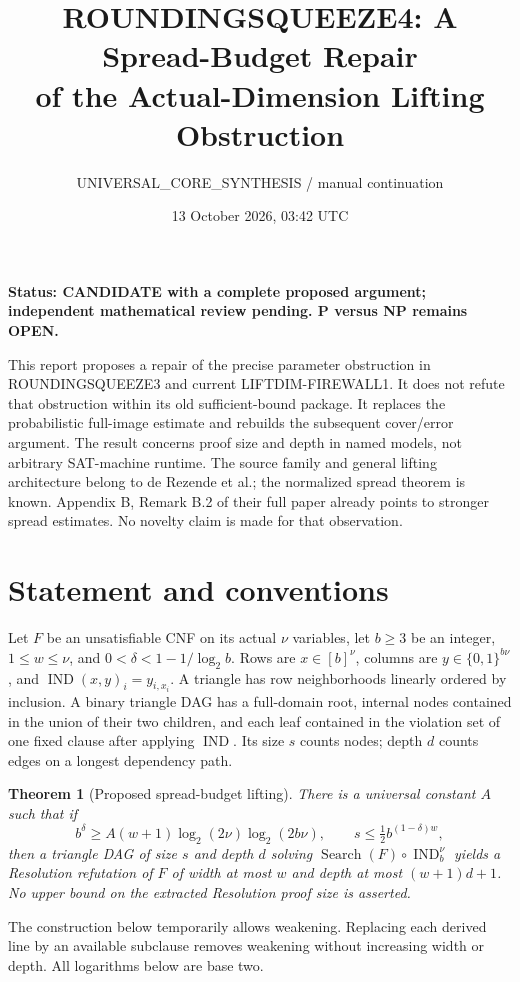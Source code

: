\documentclass[11pt]{article}
\title{ROUNDINGSQUEEZE4: A Spread-Budget Repair\\of the Actual-Dimension Lifting Obstruction}
\author{UNIVERSAL\_CORE\_SYNTHESIS / manual continuation}
\date{13 October 2026, 03:42 UTC}
\newtheorem{theorem}{Theorem}
\newcommand{\IND}{\operatorname{IND}}
\begin{document}
\maketitle
\noindent\textbf{Status: CANDIDATE with a complete proposed argument; independent mathematical review pending. P versus NP remains OPEN.}

This report proposes a repair of the precise parameter obstruction in
ROUNDINGSQUEEZE3 and current LIFTDIM-FIREWALL1. It does not refute that
obstruction within its old sufficient-bound package. It replaces the
probabilistic full-image estimate and rebuilds the subsequent cover/error
argument. The result concerns proof size and depth in named models, not
arbitrary SAT-machine runtime. The source family and general lifting
architecture belong to de Rezende et al.; the normalized spread theorem is
known. Appendix B, Remark B.2 of their full paper already points to stronger
spread estimates. No novelty claim is made for that observation.

\section{Statement and conventions}
Let $F$ be an unsatisfiable CNF on its actual $\nu$ variables, let $b\ge3$
be an integer, $1\le w\le\nu$, and $0<\delta<1-1/\log_2b$. Rows are
$x\in[b]^\nu$, columns are $y\in\{0,1\}^{b\nu}$, and
$\IND(x,y)_i=y_{i,x_i}$. A triangle has row neighborhoods linearly ordered
by inclusion. A binary triangle DAG has a full-domain root, internal nodes
contained in the union of their two children, and each leaf contained in the
violation set of one fixed clause after applying $\IND$. Its size $s$ counts
nodes; depth $d$ counts edges on a longest dependency path.

\begin{theorem}[Proposed spread-budget lifting]
There is a universal constant $A$ such that if
\[
 b^\delta\ge A(w+1)\log_2(2\nu)\log_2(2b\nu),\qquad
 s\le\tfrac12 b^{(1-\delta)w},                              \tag{1}
\]
then a triangle DAG of size $s$ and depth $d$ solving
$\operatorname{Search}(F)\circ\IND_b^\nu$ yields a Resolution refutation
of $F$ of width at most $w$ and depth at most $(w+1)d+1$.
No upper bound on the extracted Resolution proof size is asserted.
\end{theorem}
The construction below temporarily allows weakening. Replacing each derived
line by an available subclause removes weakening without increasing width
or depth. All logarithms below are base two.
\end{document}
